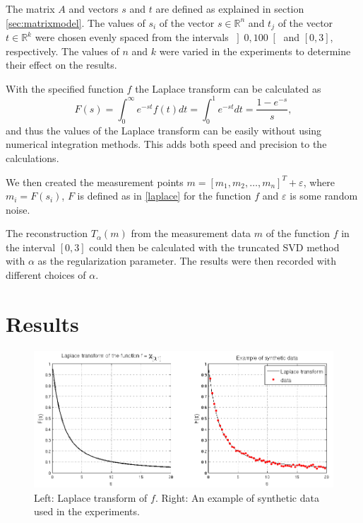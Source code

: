 \documentclass[12pt,a4]{article}
\newcommand{\R}{{\mathbb R}}
\newcommand{\eps}{\varepsilon}
\begin{document}
The matrix $A$ and vectors $s$ and $t$ are defined as explained in section \ref{sec:matrixmodel}. The values of $s_i$ of the vector $s \in \R^n$ and $t_j$ of the vector $t \in \R^k$ were chosen evenly spaced from the intervals $\left] 0, 100 \right[$ and $\left[ 0,3 \right]$, respectively. The values of $n$ and $k$ were varied in the experiments to determine their effect on the results.

With the specified function $f$ the Laplace transform can be calculated as
\begin{equation}
F(s) = \int_0^{\infty} e^{-st} f(t) dt
     = \int_0^1 e^{-st} dt
     = \frac{1 - e^{-s}}{s},
\end{equation}
and thus the values of the Laplace transform can be easily without using numerical integration methods. This adds both speed and precision to the calculations.

We then created the measurement points $m = [m_1, m_2, \ldots, m_n]^T + \eps$, where $m_i = F(s_i)$, $F$ is defined as in \eqref{laplace} for the function $f$ and $\eps$ is some random noise.

The reconstruction $T_\alpha(m)$ from the measurement data $m$ of the function $f$ in the interval $\left[0,3\right]$ could then be calculated with the truncated SVD method with $\alpha$ as the regularization parameter. The results were then recorded with different choices of $\alpha$.



\section{Results}\label{sec:results}

\begin{figure}[t]
\begin{center}
\includegraphics[scale=.5]{img/laplace_data.png}
\end{center}
\caption{Left: Laplace transform of $f$. Right: An example of synthetic data used in the experiments.}
\label{fig:laplace}
\end{figure}
\end{document}
